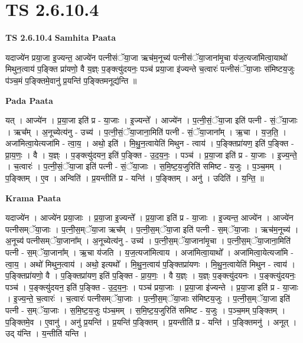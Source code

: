 \documentclass[17pt]{extarticle}
\begin{document}
\section{ TS 2.6.10.4 }

\textbf{TS 2.6.10.4 } \newline
\textbf{Samhita Paata} \newline

यदाज्ये॑न प्रया॒जा इ॒ज्यन्त॒ आज्ये॑न पत्नीसंॅया॒जा ऋच॑म॒नूच्य॑ पत्नीसंॅया॒जाना॑मृ॒चा य॑ज॒त्यजा॑मित्वा॒याथो॑ मिथुन॒त्वाय॑ प॒ङ्क्ति प्रा॑यणो॒ वै य॒ज्ञ्ः प॒ङ्क्त्यु॑दयनः॒ पञ्च॑ प्रया॒जा इ॑ज्यन्ते च॒त्वारः॑ पत्नीसंॅया॒जाः स॑मिष्टय॒जुः प॑ञ्च॒मं प॒ङ्क्तिमे॒वानु॑ प्र॒यन्ति॑ प॒ङ्क्तिमनूद्य॑न्ति ॥ \newline

\textbf{Pada Paata} \newline

यत् । आज्ये॑न । प्र॒या॒जा इति॑ प्र - या॒जाः । इ॒ज्यन्ते᳚ । आज्ये॑न । प॒त्नी॒सं॒ॅया॒जा इति॑ पत्नी - सं॒ॅया॒जाः । ऋच᳚म् । अ॒नूच्येत्य॑नु - उच्य॑ । प॒त्नी॒सं॒ॅया॒जाना॒मिति॑ पत्नी - सं॒ॅया॒जाना᳚म् । ऋ॒चा । य॒ज॒ति॒ । अजा॑मित्वा॒येत्यजा॑मि - त्वा॒य॒ । अथो॒ इति॑ । मि॒थु॒न॒त्वायेति॑ मिथुन - त्वाय॑ । प॒ङ्क्तिप्रा॑यण॒ इति॑ प॒ङ्क्ति - प्रा॒य॒णः॒ । वै । य॒ज्ञ्ः । प॒ङ्क्त्यु॑दयन॒ इति॑ प॒ङ्क्ति - उ॒द॒य॒नः॒ । पञ्च॑ । प्र॒या॒जा इति॑ प्र - या॒जाः । इ॒ज्य॒न्ते॒ । च॒त्वारः॑ । प॒त्नी॒सं॒ॅया॒जा इति॑ पत्नी - सं॒ॅया॒जाः । स॒मि॒ष्ट॒य॒जुरिति॑ समिष्ट - य॒जुः । प॒ञ्च॒मम् । प॒ङ्क्तिम् । ए॒व । अन्विति॑ । प्र॒यन्तीति॑ प्र - यन्ति॑ । प॒ङ्क्तिम् । अनु॑ । उदिति॑ । य॒न्ति॒ ॥  \newline


\textbf{Krama Paata} \newline

यदाज्ये॑न । आज्ये॑न प्रया॒जाः । प्र॒या॒जा इ॒ज्यन्ते᳚ । प्र॒या॒जा इति॑ प्र - या॒जाः । इ॒ज्यन्त॒ आज्ये॑न । आज्ये॑न पत्नीसम्ॅया॒जाः । प॒त्नी॒स॒म्ॅया॒जा ऋच᳚म् । प॒त्नी॒स॒म्ॅया॒जा इति॑ पत्नी - स॒म्ॅया॒जाः । ऋच॑म॒नूच्य॑ । अ॒नूच्य॑ पत्नीसम्ॅया॒जाना᳚म् । अ॒नूच्येत्य॑नु - उच्य॑ । प॒त्नी॒स॒म्ॅया॒जाना॑मृ॒चा । प॒त्नी॒स॒म्ॅया॒जाना॒मिति॑ पत्नी - स॒म्ॅया॒जाना᳚म् । ऋ॒चा य॑जति । य॒ज॒त्यजा॑मित्वाय । अजा॑मित्वा॒याथो᳚ । अजा॑मित्वा॒येत्यजा॑मि - त्वा॒य॒ । अथो॑ मिथुन॒त्वाय॑ । अथो॒ इत्यथो᳚ । मि॒थु॒न॒त्वाय॑ प॒ङ्क्तिप्रा॑यणः । मि॒थु॒न॒त्वायेति॑ मिथुन - त्वाय॑ । प॒ङ्क्तिप्रा॑यणो॒ वै । प॒ङ्क्तिप्रा॑यण॒ इति॑ प॒ङ्क्ति - प्रा॒य॒णः॒ । वै य॒ज्ञ्ः । य॒ज्ञ्ः प॒ङ्क्त्यु॑दयनः । प॒ङ्क्त्यु॑दयनः॒ पञ्च॑ । प॒ङ्क्त्यु॑दयन॒ इति॑ प॒ङ्क्ति - उ॒द॒य॒नः॒ । पञ्च॑ प्रया॒जाः । प्र॒या॒जा इ॑ज्यन्ते । प्र॒या॒जा इति॑ प्र - या॒जाः । इ॒ज्य॒न्ते॒ च॒त्वारः॑ । च॒त्वारः॑ पत्नीसम्ॅया॒जाः । प॒त्नी॒स॒म्ॅया॒जाः स॑मिष्टय॒जुः । प॒त्नी॒स॒म्ॅया॒जा इति॑ पत्नी - स॒म्ॅया॒जाः । स॒मि॒ष्ट॒य॒जुः प॑ञ्च॒मम् । स॒मि॒ष्ट॒य॒जुरिति॑ समिष्ट - य॒जुः । प॒ञ्च॒मम् प॒ङ्क्तिम् । प॒ङ्क्तिमे॒व । ए॒वानु॑ । अनु॑ प्र॒यन्ति॑ । प्र॒यन्ति॑ प॒ङ्क्तिम् । प्र॒यन्तीति॑ प्र - यन्ति॑ । प॒ङ्क्तिमनु॑ । अनूत् । उद् य॑न्ति । य॒न्तीति॑ यन्ति । \newline
\end{document}
